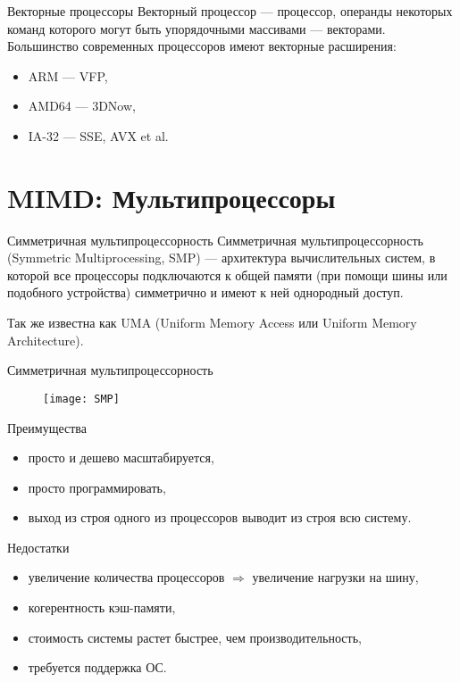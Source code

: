 \begin{frame}{Векторные процессоры}
Векторный процессор --- процессор, операнды некоторых команд которого могут быть
упорядочными массивами --- векторами.
\vfill
Большинство современных процессоров имеют векторные расширения:
\begin{itemize}
    \item ARM --- VFP,
    \item AMD64 --- 3DNow,
    \item IA-32 --- SSE, AVX et al.
\end{itemize}
\end{frame}

\section{MIMD: Мультипроцессоры}

\begin{frame}{Симметричная мультипроцессорность}
Симметричная мультипроцессорность (\abbr Symmetric Multiprocessing, SMP) --- архитектура вычислительных систем, в которой все процессоры подключаются к общей памяти (при помощи шины или подобного устройства) симметрично и имеют к ней однородный доступ.

Так же известна как UMA (Uniform Memory Access или Uniform Memory Architecture).
\end{frame}

\begin{frame}{Симметричная мультипроцессорность}
\begin{figure}[htpb]
    \centering
    \texttt{[image: SMP]}
\end{figure}
\end{frame}

\begin{frame}{Преимущества}
\begin{itemize}
    \item просто и дешево масштабируется,
    \item просто программировать,
    \item выход из строя одного из процессоров выводит из строя всю систему.
\end{itemize}
\end{frame}

\begin{frame}{Недостатки}
\begin{itemize}
    \item увеличение количества процессоров $\Rightarrow$ увеличение нагрузки на шину,
    \item когерентность кэш-памяти,
    \item стоимость системы растет быстрее, чем производительность,
    \item требуется поддержка ОС.
\end{itemize}
\end{frame}

